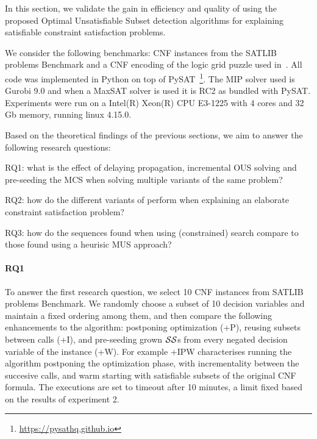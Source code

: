 In this section, we validate the gain in efficiency and quality of using the proposed Optimal Unsatisfiable Subset detection algorithms for explaining satisfiable constraint satisfaction problems.

We consider the following benchmarks: CNF instances from the SATLIB problems Benchmark \cite{hoos2000satlib} and a CNF encoding of the logic grid puzzle used in~\cite{ecai/BogaertsGCG20}. All code was implemented in Python on top of %
PySAT~\footnote{\url{https://pysathq.github.io}}. The MIP solver used is Gurobi 9.0 and when a MaxSAT solver is used it is RC2 as bundled with PySAT. Experiments were run on a Intel(R) Xeon(R) CPU E3-1225 with 4 cores and 32 Gb memory, running linux 4.15.0.

Based on the theoretical findings of the previous sections, we aim to answer the following research questions:
\begin{compactitem}
\item RQ1: what is the effect of delaying propagation, incremental OUS solving and pre-seeding the MCS when solving multiple variants of the same problem?
\item RQ2: how do the different variants of \omus perform when explaining an elaborate constraint satisfaction problem?
\item RQ3: how do the sequences found when using (constrained) \omus search compare to those found using a heurisic MUS approach?
\end{compactitem}

\paragraph{RQ1}
To answer the first research question, we select 10 CNF instances from SATLIB problems Benchmark. We randomly choose a subset of 10 decision variables and maintain a fixed ordering among them, and then compare the following enhancements to the \omus algorithm: postponing optimization (+P), reusing subsets between \omus calls (+I), and pre-seeding grown $\mathcal{SS}$s from every negated decision variable of the instance (+W). For example \omus+IPW characterises running the \omus algorithm postponing the optimization phase, with incrementality between the succesive calls, and warm starting with satisfiable subsets of the original CNF formula.
The executions are set to timeout after 10 minutes, a limit fixed based on the results of experiment 2.

